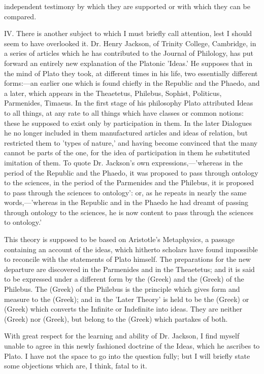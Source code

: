 \documentclass[11pt,letter]{article}
\begin{document}
independent testimony by which they are supported or with which they can be compared.

\par  IV. There is another subject to which I must briefly call attention, lest I should seem to have overlooked it. Dr. Henry Jackson, of Trinity College, Cambridge, in a series of articles which he has contributed to the Journal of Philology, has put forward an entirely new explanation of the Platonic 'Ideas.' He supposes that in the mind of Plato they took, at different times in his life, two essentially different forms:—an earlier one which is found chiefly in the Republic and the Phaedo, and a later, which appears in the Theaetetus, Philebus, Sophist, Politicus, Parmenides, Timaeus. In the first stage of his philosophy Plato attributed Ideas to all things, at any rate to all things which have classes or common notions: these he supposed to exist only by participation in them. In the later Dialogues he no longer included in them manufactured articles and ideas of relation, but restricted them to 'types of nature,' and having become convinced that the many cannot be parts of the one, for the idea of participation in them he substituted imitation of them. To quote Dr. Jackson's own expressions,—'whereas in the period of the Republic and the Phaedo, it was proposed to pass through ontology to the sciences, in the period of the Parmenides and the Philebus, it is proposed to pass through the sciences to ontology': or, as he repeats in nearly the same words,—'whereas in the Republic and in the Phaedo he had dreamt of passing through ontology to the sciences, he is now content to pass through the sciences to ontology.'

\par  This theory is supposed to be based on Aristotle's Metaphysics, a passage containing an account of the ideas, which hitherto scholars have found impossible to reconcile with the statements of Plato himself. The preparations for the new departure are discovered in the Parmenides and in the Theaetetus; and it is said to be expressed under a different form by the (Greek) and the (Greek) of the Philebus. The (Greek) of the Philebus is the principle which gives form and measure to the (Greek); and in the 'Later Theory' is held to be the (Greek) or (Greek) which converts the Infinite or Indefinite into ideas. They are neither (Greek) nor (Greek), but belong to the (Greek) which partakes of both.

\par  With great respect for the learning and ability of Dr. Jackson, I find myself unable to agree in this newly fashioned doctrine of the Ideas, which he ascribes to Plato. I have not the space to go into the question fully; but I will briefly state some objections which are, I think, fatal to it.
\end{document}
